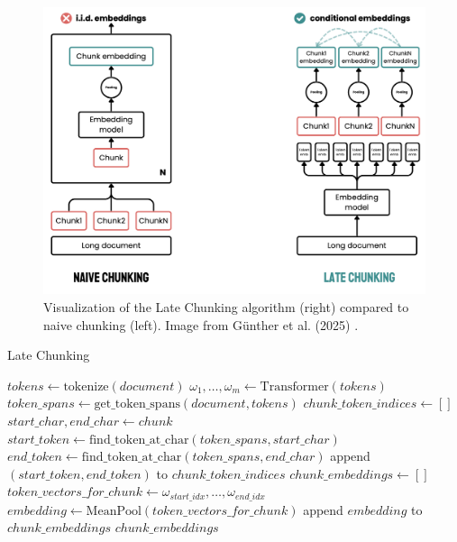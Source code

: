 \begin{figure}[!htbp]
    \centering
    \includegraphics[width=\textwidth]{images/chapter3/late_chunking.png}
    \caption{Visualization of the Late Chunking algorithm (right) compared to naive chunking (left). Image from Günther et al. (2025) \autocite{günther2025latechunkingcontextualchunk}.}
    \label{fig:late_chunking}
\end{figure}

\begin{algorithm}
\caption{Late Chunking}
\label{alg:late_chunking}
\begin{algorithmic}[1]
    \State $tokens \gets \text{tokenize}(document)$
    \State $\omega_1, \dots, \omega_m \gets \text{Transformer}(tokens)$ 
    \State $token\_spans \gets \text{get\_token\_spans}(document, tokens)$
    \State $chunk\_token\_indices \gets []$
        \State $start\_char, end\_char \gets chunk$
        \State $start\_token \gets \text{find\_token\_at\_char}(token\_spans, start\_char)$
        \State $end\_token \gets \text{find\_token\_at\_char}(token\_spans, end\_char)$
        \State append $(start\_token, end\_token)$ to $chunk\_token\_indices$
    \EndFor
    \State $chunk\_embeddings \gets []$
        \State $token\_vectors\_for\_chunk \gets \omega_{start\_idx}, \dots, \omega_{end\_idx}$
        \State $embedding \gets \text{MeanPool}(token\_vectors\_for\_chunk)$
        \State append $embedding$ to $chunk\_embeddings$
    \EndFor
    \State \Return $chunk\_embeddings$
\EndProcedure
\end{algorithmic}
\end{algorithm}